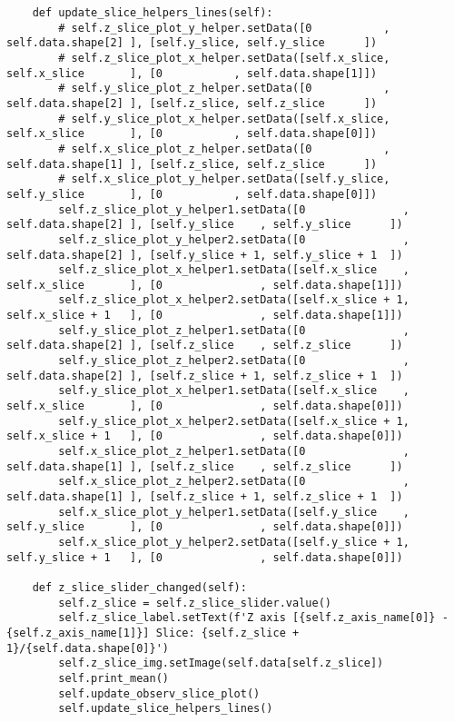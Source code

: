 \documentclass[../main.tex]{subfiles}
\begin{document}
\begin{lstlisting}
    def update_slice_helpers_lines(self):
        # self.z_slice_plot_y_helper.setData([0           , self.data.shape[2] ], [self.y_slice, self.y_slice      ])
        # self.z_slice_plot_x_helper.setData([self.x_slice, self.x_slice       ], [0           , self.data.shape[1]])
        # self.y_slice_plot_z_helper.setData([0           , self.data.shape[2] ], [self.z_slice, self.z_slice      ])
        # self.y_slice_plot_x_helper.setData([self.x_slice, self.x_slice       ], [0           , self.data.shape[0]])
        # self.x_slice_plot_z_helper.setData([0           , self.data.shape[1] ], [self.z_slice, self.z_slice      ])
        # self.x_slice_plot_y_helper.setData([self.y_slice, self.y_slice       ], [0           , self.data.shape[0]])
        self.z_slice_plot_y_helper1.setData([0               , self.data.shape[2] ], [self.y_slice    , self.y_slice      ])
        self.z_slice_plot_y_helper2.setData([0               , self.data.shape[2] ], [self.y_slice + 1, self.y_slice + 1  ])
        self.z_slice_plot_x_helper1.setData([self.x_slice    , self.x_slice       ], [0               , self.data.shape[1]])
        self.z_slice_plot_x_helper2.setData([self.x_slice + 1, self.x_slice + 1   ], [0               , self.data.shape[1]])
        self.y_slice_plot_z_helper1.setData([0               , self.data.shape[2] ], [self.z_slice    , self.z_slice      ])
        self.y_slice_plot_z_helper2.setData([0               , self.data.shape[2] ], [self.z_slice + 1, self.z_slice + 1  ])
        self.y_slice_plot_x_helper1.setData([self.x_slice    , self.x_slice       ], [0               , self.data.shape[0]])
        self.y_slice_plot_x_helper2.setData([self.x_slice + 1, self.x_slice + 1   ], [0               , self.data.shape[0]])
        self.x_slice_plot_z_helper1.setData([0               , self.data.shape[1] ], [self.z_slice    , self.z_slice      ])
        self.x_slice_plot_z_helper2.setData([0               , self.data.shape[1] ], [self.z_slice + 1, self.z_slice + 1  ])
        self.x_slice_plot_y_helper1.setData([self.y_slice    , self.y_slice       ], [0               , self.data.shape[0]])
        self.x_slice_plot_y_helper2.setData([self.y_slice + 1, self.y_slice + 1   ], [0               , self.data.shape[0]])

    def z_slice_slider_changed(self):
        self.z_slice = self.z_slice_slider.value()
        self.z_slice_label.setText(f'Z axis [{self.z_axis_name[0]} - {self.z_axis_name[1]}] Slice: {self.z_slice + 1}/{self.data.shape[0]}')
        self.z_slice_img.setImage(self.data[self.z_slice])
        self.print_mean()
        self.update_observ_slice_plot()
        self.update_slice_helpers_lines()


\end{lstlisting}
\end{document}
